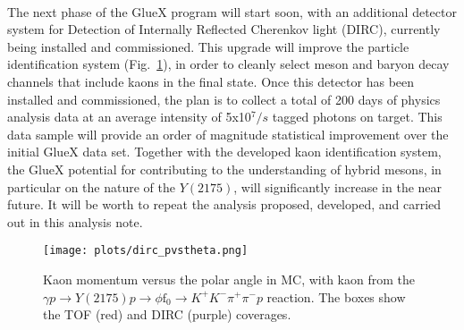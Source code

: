 ~\par The next phase of the GlueX program will start soon, with an additional detector system for Detection of Internally Reflected Cherenkov light (DIRC), currently being installed and commissioned. This upgrade will improve the particle identification system (Fig.~\ref{fig.summ}), in order to cleanly select meson and baryon decay channels that include kaons in the final state. Once this detector has been installed and commissioned, the plan is to collect a total of 200 days of physics analysis data at an average intensity of 5x10$^{7}/s$ tagged photons on target. This data sample will provide an order of magnitude statistical improvement over the initial GlueX data set. Together with the developed kaon identification system, the GlueX potential for contributing to the understanding of hybrid mesons, in particular on the nature of the $Y(2175)$, will significantly increase in the near future. It will be worth to repeat the analysis proposed, developed, and carried out in this analysis note.

\begin{figure}[htbp]
    \centering
    \texttt{[image: plots/dirc\_pvstheta.png]}
    \caption{Kaon momentum versus the polar angle in MC, with kaon from the $\gamma p \rightarrow Y(2175) p \rightarrow \phi \mathrm{f}_0  \rightarrow  K^{+} K^{-} \pi^{+} \pi^{-} p$ reaction. The boxes show the TOF (red) and DIRC (purple) coverages.}
    \label{fig.summ}
\end{figure}
